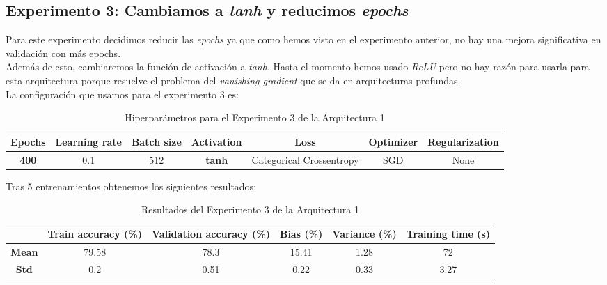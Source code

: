 \documentclass{article}
\begin{document}
		\subsection{Experimento 3: Cambiamos a \textit{tanh} y reducimos \textit{epochs}}
		\label{s-a1-e3}
			Para este experimento decidimos reducir las \textit{epochs} ya que como hemos visto en el experimento anterior, no hay una mejora significativa en validaci\'on con m\'as epochs.\\
			Adem\'as de esto, cambiaremos la funci\'on de activaci\'on a \textit{tanh}. Hasta el momento hemos usado \textit{ReLU} pero no hay raz\'on para usarla para esta arquitectura porque resuelve el problema del \textit{vanishing gradient} que se da en arquitecturas profundas.\\
			La configuraci\'on que usamos para el experimento 3 es:
			\begin{table}[!h]
				\begin{center}
					\begin{tabular}{| c | c | c | c | c | c | c |}
						\textbf{Epochs} & \textbf{Learning rate} & \textbf{Batch size} & \textbf{Activation} & \textbf{Loss} & \textbf{Optimizer} & \textbf{Regularization} \\ \hline
						\textbf{400} & 0.1 & 512 & \textbf{tanh} & Categorical Crossentropy & SGD & None
					\end{tabular}
					\caption{Hiperpar\'ametros para el Experimento 3 de la Arquitectura 1}
					\label{tab:hip-a1-e3}
				\end{center}
			\end{table}
			
			Tras 5 entrenamientos obtenemos los siguientes resultados:
			\begin{table}[!h]
				\begin{center}
					\begin{tabular}{ c | c | c | c | c | c |}
						\ & \textbf{Train accuracy (\%)} & \textbf{Validation accuracy (\%)} & \textbf{Bias (\%)} & \textbf{Variance (\%)} & \textbf{Training time (s)} \\ \hline
						\textbf{Mean} & 79.58 & 78.3 & 15.41 & 1.28 & 72\\ \hline
						\textbf{Std} & 0.2 & 0.51 & 0.22 & 0.33 & 3.27 \\ \hline
					\end{tabular}
					\caption{Resultados del Experimento 3 de la Arquitectura 1}
					\label{tab:res-a1-e3}
				\end{center}
			\end{table}
			
\end{document}
